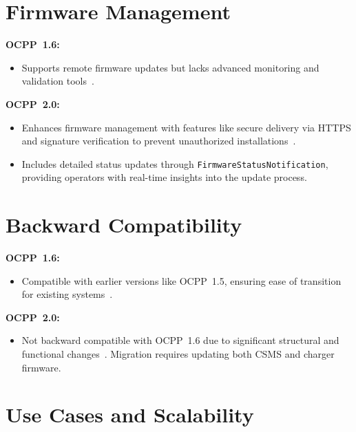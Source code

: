 \documentclass[12pt,a4paper]{report}
\begin{document}
\section{Firmware Management}

\textbf{OCPP~1.6:}
\begin{itemize}
  \item Supports remote firmware updates but lacks advanced monitoring and validation
        tools~\autocite{ocpp16_ed2}.
\end{itemize}
\noindent
\textbf{OCPP~2.0:}
\begin{sloppypar}
\begin{itemize}
  \item Enhances firmware management with features like secure delivery via HTTPS and signature
        verification to prevent unauthorized installations~\autocite{ocpp201}.
  \item Includes detailed status updates through \texttt{FirmwareStatusNotification}, providing
        operators with real-time insights into the update process.
\end{itemize}
\end{sloppypar}

\section{Backward Compatibility}

\textbf{OCPP~1.6:}
\begin{itemize}
  \item Compatible with earlier versions like OCPP~1.5, ensuring ease of transition for
        existing systems~\autocite{ocpp16_ed2}.
\end{itemize}
\noindent
\textbf{OCPP~2.0:}
\begin{itemize}
  \item Not backward compatible with OCPP~1.6 due to significant structural and functional
        changes~\autocite{ocpp201}. Migration requires updating both CSMS and charger firmware.
\end{itemize}

\section{Use Cases and Scalability}
\end{document}
